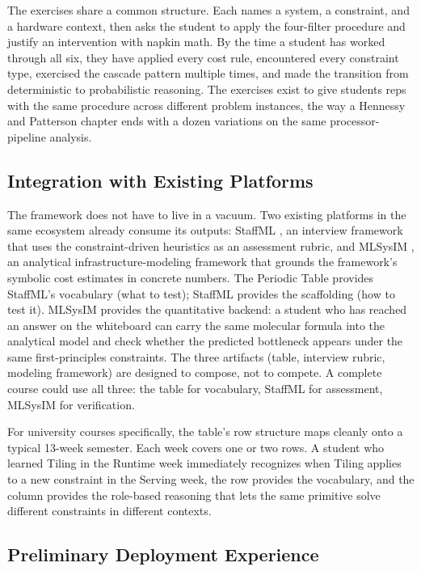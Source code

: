 \documentclass[10pt,twocolumn]{article}
\begin{document}
The exercises share a common structure. Each names a system, a constraint, and a hardware context, then asks the student to apply the four-filter procedure and justify an intervention with napkin math. By the time a student has worked through all six, they have applied every cost rule, encountered every constraint type, exercised the cascade pattern multiple times, and made the transition from deterministic to probabilistic reasoning. The exercises exist to give students reps with the same procedure across different problem instances, the way a Hennessy and Patterson chapter ends with a dozen variations on the same processor-pipeline analysis.

\subsection{Integration with Existing Platforms}
\label{sec:curriculum}

The framework does not have to live in a vacuum. Two existing platforms in the same ecosystem already consume its outputs: StaffML \citep{reddi2026staffml}, an interview framework that uses the constraint-driven heuristics as an assessment rubric, and MLSysIM \citep{reddi2026mlsysim}, an analytical infrastructure-modeling framework that grounds the framework's symbolic cost estimates in concrete numbers. The Periodic Table provides StaffML's vocabulary (what to test); StaffML provides the scaffolding (how to test it). MLSysIM provides the quantitative backend: a student who has reached an answer on the whiteboard can carry the same molecular formula into the analytical model and check whether the predicted bottleneck appears under the same first-principles constraints. The three artifacts (table, interview rubric, modeling framework) are designed to compose, not to compete. A complete course could use all three: the table for vocabulary, StaffML for assessment, MLSysIM for verification.

For university courses specifically, the table's row structure maps cleanly onto a typical 13-week semester. Each week covers one or two rows. A student who learned Tiling in the Runtime week immediately recognizes when Tiling applies to a new constraint in the Serving week, the row provides the vocabulary, and the column provides the role-based reasoning that lets the same primitive solve different constraints in different contexts.

\subsection{Preliminary Deployment Experience}
\label{sec:deployment}
\end{document}
